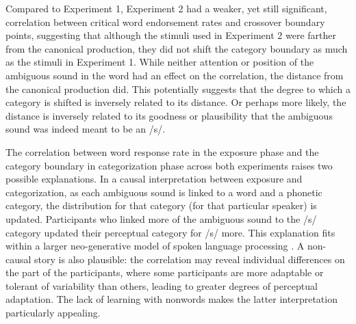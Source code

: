 Compared to Experiment 1, Experiment 2 had a weaker, yet still significant, correlation between critical word endorsement rates and crossover boundary points, suggesting that although the stimuli used in Experiment 2 were farther from the canonical production, they did not shift the category boundary as much as the stimuli in Experiment 1.  While neither attention or position of the ambiguous sound in the word had an effect on the correlation, the distance from the canonical production did.  This potentially suggests that the degree to which a category is shifted is inversely related to its distance.  Or perhaps more likely, the distance is inversely related to its goodness or plausibility that the ambiguous sound was indeed meant to be an /s/.

The correlation between word response rate in the exposure phase and the category boundary in categorization phase across both experiments raises two possible explanations. 
In a causal interpretation between exposure and categorization, as each ambiguous sound is linked to a word and a phonetic category, the distribution for that category (for that particular speaker) is updated.
 Participants who linked more of the ambiguous sound to the /s/ category updated their perceptual category for /s/ more. 
This explanation fits within a larger neo-generative model of spoken language processing \citep{Pierrehumbert2002}.  
A non-causal story is also plausible:  the correlation may reveal individual differences on the part of the participants, where some participants are more adaptable or tolerant of variability than others, leading to greater degrees of perceptual adaptation. 
The lack of learning with nonwords \citep{Norris2003} makes the latter interpretation particularly appealing.